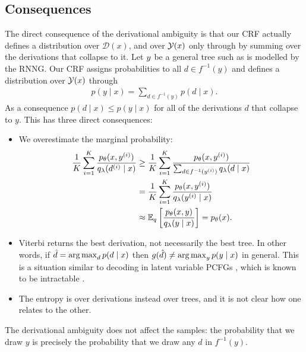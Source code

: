   \subsection{Consequences}
    The direct consequence of the derivational ambiguity is that our CRF actually defines a distribution over $\mathcal{D}(x)$, and over $\mathcal{Y}(x)$ only through by summing over the derivations that collapse to it. Let $y$ be a general tree such as is modelled by the RNNG. Our CRF assigns probabilities to all $d \in f^{-1}(y)$ and defines a distribution over $\mathcal{Y}(x)$ through
    \begin{align*}
      p(y \mid x) = \sum_{d \in f^{-1}(y)} p(d \mid x).
    \end{align*}
    As a consequence $p(d \mid x) \leq p(y \mid x)$ for all of the derivations $d$ that collapse to $y$. This has three direct consequences:
    \begin{itemize}
      \item We overestimate the marginal probability:
        \begin{align*}
          \frac{1}{K}\sum_{i=1}^K  \frac{p_{\theta}( x, y^{(i)} )}{q_{\lambda}(d^{(i)} \mid x)}
            &\geq \frac{1}{K}\sum_{i=1}^K  \frac{p_{\theta}( x, y^{(i)} )}{\sum_{d \in f^{-1}(y^{(i)})} q_{\lambda}(d \mid x)}  \\
            &= \frac{1}{K}\sum_{i=1}^K  \frac{p_{\theta}( x, y^{(i)} )}{q_{\lambda}(y^{(i)} \mid x)}  \\
            &\approx \operatorname{\mathbb{E}}_{q} \bigg[\frac{p_{\theta}(x,y )}{q_{\lambda}(y \mid x)} \bigg] = p_{\theta}(x).
        \end{align*}
      \item Viterbi returns the best derivation, not necessarily the best tree. In other words, if $\hat{d} = \operatorname*{arg\,max}_d p(d \mid x)$ then $g(\hat{d}) \neq \operatorname*{arg\,max}_y p(y \mid x)$ in general. This is a situation similar to decoding in latent variable PCFGs \citep{petrov2006learning}, which is known to be intractable \citep{sima2002computational}.
      \item The entropy is over derivations instead over trees, and it is not clear how one relates to the other.
    \end{itemize}
    The derivational ambiguity does not affect the samples: the probability that we draw $y$ is precisely the probability that we draw any $d$ in $f^{-1}(y)$.

